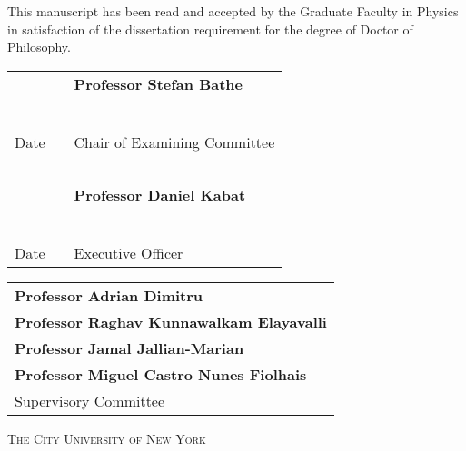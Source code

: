 \begin{center}
This manuscript has been read and accepted by the Graduate Faculty in Physics in satisfaction of the dissertation requirement for the degree of Doctor of Philosophy.
\end{center}

\vspace{0.75in}

\begin{tabular}{p{1.75in}p{0.5in}p{3.5in}}
~                                   & & \textbf{Professor Stefan Bathe}\\
~                                   & & \\
\hrulefill                          & &\hrulefill \\
Date                                & & Chair of Examining Committee\\
~                                   & & \\
~                                   & & \textbf{Professor Daniel Kabat}\\
~                                   & & \\
\hrulefill                          & &\hrulefill \\
Date                                & & Executive Officer\\
\end{tabular}

\vspace{0.75in}

\begin{tabular}{l}
	\textbf{Professor Adrian Dimitru} \\
	\textbf{Professor Raghav Kunnawalkam Elayavalli} \\
	\textbf{Professor Jamal Jallian-Marian} \\
	\textbf{Professor Miguel Castro Nunes Fiolhais} \\
Supervisory Committee \\
\end{tabular}


\vspace{\fill}
\begin{center}
\textsc{The City University of New York}
\end{center}
